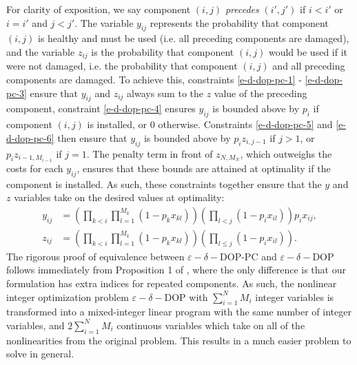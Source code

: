 \documentclass[11pt,authoryear,a4paper]{article}
\theoremstyle{definition}
\begin{document}
{For clarity of exposition, we say component $(i,j)$ \emph{precedes} $(i',j')$ if $i<i'$ or $i=i'$ and $j<j'$. The variable $y_{ij}$ represents the probability that component $(i,j)$ is healthy and must be used (i.e. all preceding components are damaged), and the variable $z_{ij}$ is the probability that component $(i,j)$ would be used if it were not damaged, i.e. the probability that component $(i,j)$ and all preceding components are damaged. To achieve this, constraints \eqref{e-d-dop-pc-1}
 - \eqref{e-d-dop-pc-3} ensure that $y_{ij}$ and $z_{ij}$ always sum to the $z$ value of the preceding component, constraint \eqref{e-d-dop-pc-4} ensures $y_{ij}$ is bounded above by $p_i$ if component $(i,j)$ is installed, or 0 otherwise. Constraints \eqref{e-d-dop-pc-5} and \eqref{e-d-dop-pc-6} then ensure that $y_{ij}$ is bounded above by $p_iz_{i,j-1}$ if $j>1$, or $p_iz_{i-1,M_{i-1}}$ if $j=1$. The penalty term in front of $z_{N,M_N}$, which outweighs the costs for each $y_{ij}$, ensures that these bounds are attained at optimality if the component is installed. As such, these constraints together ensure that the $y$ and $z$ variables take on the desired values at optimality:
\begin{align}
    y_{ij} &= \left(\prod_{k<i}\prod_{l=1}^{M_k}(1 - p_kx_{kl})\right)\left(\prod_{l<j}(1 - p_ix_{il})\right)p_ix_{ij}, \\
    z_{ij} &= \left(\prod_{k<i}\prod_{l=1}^{M_k}(1 - p_kx_{kl})\right)\left(\prod_{l\leq j}(1 - p_ix_{il})\right).
\end{align}
The rigorous proof of equivalence between $\varepsilon-\delta-$DOP-PC and $\varepsilon-\delta-$DOP follows immediately from Proposition 1 of \cite{OHANLEY201363}, where the only difference is that our formulation has extra indices for repeated components. As such, the nonlinear integer optimization problem $\varepsilon-\delta-$DOP with $\sum_{i=1}^NM_i$ integer variables is transformed into a mixed-integer linear program with the same number of integer variables, and $2\sum_{i=1}^N M_i$ continuous variables which take on all of the nonlinearities from the original problem. This results in a much easier problem to solve in general.}
\end{document}
